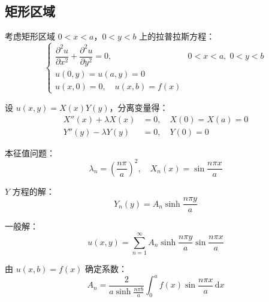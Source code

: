 \subsection{矩形区域}

考虑矩形区域 $0 < x < a$，$0 < y < b$ 上的拉普拉斯方程：
\begin{equation}
    \begin{cases}
        \dfrac{\partial^2 u}{\partial x^2} + \dfrac{\partial^2 u}{\partial y^2} = 0, & 0 < x < a, \; 0 < y < b \\
        u(0, y) = u(a, y) = 0 \\
        u(x, 0) = 0, \quad u(x, b) = f(x)
    \end{cases}
\end{equation}

设 $u(x, y) = X(x)Y(y)$，分离变量得：
\begin{align}
    X''(x) + \lambda X(x) &= 0, \quad X(0) = X(a) = 0 \\
    Y''(y) - \lambda Y(y) &= 0, \quad Y(0) = 0
\end{align}

本征值问题：
\begin{equation}
    \lambda_n = \left(\frac{n\pi}{a}\right)^2, \quad X_n(x) = \sin\frac{n\pi x}{a}
\end{equation}

$Y$ 方程的解：
\begin{equation}
    Y_n(y) = A_n\sinh\frac{n\pi y}{a}
\end{equation}

一般解：
\begin{equation}
    u(x, y) = \sum_{n=1}^{\infty} A_n\sinh\frac{n\pi y}{a}\sin\frac{n\pi x}{a}
\end{equation}

由 $u(x, b) = f(x)$ 确定系数：
\begin{equation}
    A_n = \frac{2}{a\sinh\frac{n\pi b}{a}}\int_0^a f(x)\sin\frac{n\pi x}{a}\,\mathrm{d}x
\end{equation}

